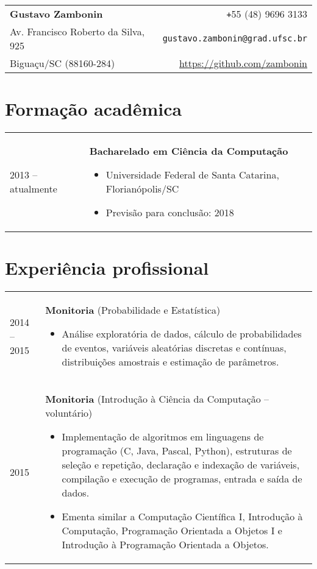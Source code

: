 \documentclass[11pt]{article}
\makeatletter
\newenvironment{headertable}{
    \hspace{-0.9cm}
    \begin{tabular*}{20.1cm}{l@{\extracolsep{\fill}}r}
}{\end{tabular*}}
\newenvironment{contenttable}{
    \newcolumntype{L}{>{\bf \raggedleft}p{0.13\textwidth}}
    \newcolumntype{R}{p{0.84\textwidth}}
    \begin{tabular}{L!{\color{lightgray} \vrule}R}
}{\end{tabular}
}
\newenvironment{smallitem}{
    \vspace{-2mm}
    \begin{itemize}
    \setlength{\parskip}{0pt}
    \setlength{\itemsep}{2pt}
}{\vspace{-4mm} \end{itemize}}
\makeatother
\begin{document}
\begin{headertable}
\bf \Large Gustavo Zambonin         & \texttt{+}55 (48) 9696 3133            \\
Av. Francisco Roberto da Silva, 925 & \texttt{gustavo.zambonin@grad.ufsc.br} \\
Biguaçu/SC (88160-284)              & \url{https://github.com/zambonin}      \\
\end{headertable}

\section*{Formação acadêmica}
\begin{contenttable}
    2013 -- atualmente & \textbf{Bacharelado em Ciência da Computação}
    \begin{smallitem}
        \item Universidade Federal de Santa Catarina, Florianópolis/SC
        \item Previsão para conclusão: 2018
    \end{smallitem}
\end{contenttable}

\vspace{-4mm}
\section*{Experiência profissional}
\begin{contenttable}
    2014 -- 2015 & \textbf{Monitoria} (Probabilidade e Estatística)
    \begin{smallitem}
        \item Análise exploratória de dados, cálculo de probabilidades de
        eventos, variáveis aleatórias discretas e contínuas, distribuições
        amostrais e estimação de parâmetros.
    \end{smallitem} \\

    2015 & \textbf{Monitoria} (Introdução à Ciência da Computação -- voluntário)
    \begin{smallitem}
        \item Implementação de algoritmos em linguagens de programação (C,
        Java, Pascal, Python), estruturas de seleção e repetição, declaração e
        indexação de variáveis, compilação e execução de programas, entrada e
        saída de dados.
        \item Ementa similar a Computação Científica I, Introdução à
        Computação, Programação Orientada a Objetos I e Introdução à
        Programação Orientada a Objetos.
    \end{smallitem}
\end{contenttable}
\end{document}
